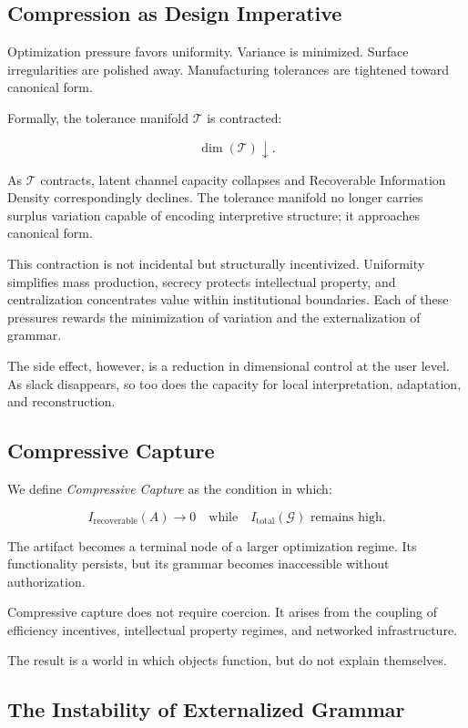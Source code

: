\documentclass[11pt]{article}
\begin{document}
\subsection{Compression as Design Imperative}

Optimization pressure favors uniformity.
Variance is minimized.
Surface irregularities are polished away.
Manufacturing tolerances are tightened toward canonical form.

Formally, the tolerance manifold $\mathcal{T}$ is contracted:

\[
\dim(\mathcal{T}) \downarrow.
\]

As $\mathcal{T}$ contracts, latent channel capacity collapses and
Recoverable Information Density correspondingly declines. The tolerance
manifold no longer carries surplus variation capable of encoding
interpretive structure; it approaches canonical form.

This contraction is not incidental but structurally incentivized.
Uniformity simplifies mass production, secrecy protects intellectual
property, and centralization concentrates value within institutional
boundaries. Each of these pressures rewards the minimization of
variation and the externalization of grammar.

The side effect, however, is a reduction in dimensional control at the
user level. As slack disappears, so too does the capacity for local
interpretation, adaptation, and reconstruction.

\subsection{Compressive Capture}

We define \emph{Compressive Capture} as the condition in which:

\[
I_{\text{recoverable}}(A) \rightarrow 0
\quad \text{while} \quad
I_{\text{total}}(\mathcal{G}) \text{ remains high}.
\]

The artifact becomes a terminal node of a larger optimization regime.
Its functionality persists,
but its grammar becomes inaccessible without authorization.

Compressive capture does not require coercion.
It arises from the coupling of efficiency incentives,
intellectual property regimes,
and networked infrastructure.

The result is a world in which objects function,
but do not explain themselves.

\subsection{The Instability of Externalized Grammar}
\end{document}
